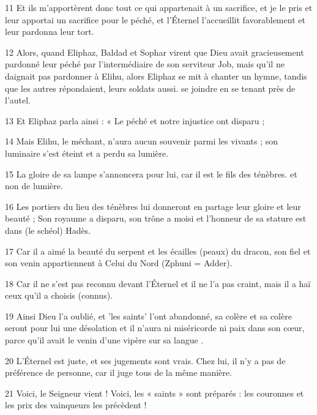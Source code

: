 \par 11 Et ils m'apportèrent donc tout ce qui appartenait à un sacrifice, et je le pris et leur apportai un sacrifice pour le péché, et l'Éternel l'accueillit favorablement et leur pardonna leur tort.

\par 12 Alors, quand Eliphaz, Baldad et Sophar virent que Dieu avait gracieusement pardonné leur péché par l'intermédiaire de son serviteur Job, mais qu'il ne daignait pas pardonner à Elihu, alors Eliphaz se mit à chanter un hymne, tandis que les autres répondaient, leurs soldats aussi. se joindre en se tenant près de l’autel.

\par 13 Et Eliphaz parla ainsi : « Le péché et notre injustice ont disparu ;

\par 14 Mais Elihu, le méchant, n'aura aucun souvenir parmi les vivants ; son luminaire s'est éteint et a perdu sa lumière.

\par 15 La gloire de sa lampe s'annoncera pour lui, car il est le fils des ténèbres. et non de lumière.

\par 16 Les portiers du lieu des ténèbres lui donneront en partage leur gloire et leur beauté ; Son royaume a disparu, son trône a moisi et l'honneur de sa stature est dans (le schéol) Hadès.

\par 17 Car il a aimé la beauté du serpent et les écailles (peaux) du dracon, son fiel et son venin appartiennent à Celui du Nord (Zphuni = Adder).

\par 18 Car il ne s'est pas reconnu devant l'Éternel et il ne l'a pas craint, mais il a haï ceux qu'il a choisis (connus).

\par 19 Ainsi Dieu l'a oublié, et 'les saints' l'ont abandonné, sa colère et sa colère seront pour lui une désolation et il n'aura ni miséricorde ni paix dans son cœur, parce qu'il avait le venin d'une vipère sur sa langue .

\par 20 L'Éternel est juste, et ses jugements sont vrais. Chez lui, il n'y a pas de préférence de personne, car il juge tous de la même manière.

\par 21 Voici, le Seigneur vient ! Voici, les « saints » sont préparés : les couronnes et les prix des vainqueurs les précèdent !

